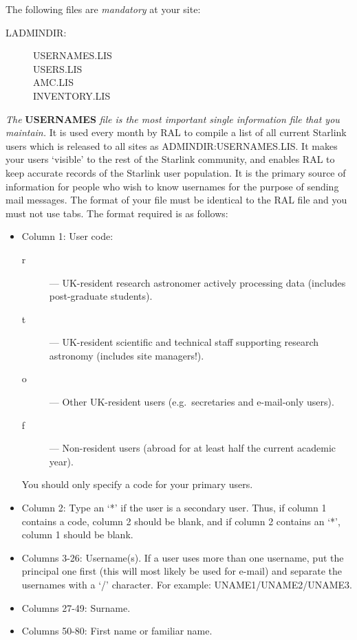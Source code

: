 The following files are {\em mandatory} at your site:
\begin{description}
\begin{description}
\item [LADMINDIR:] \hfill
\begin{description}
\item [USERNAMES.LIS] \hfill
\item [USERS.LIS] \hfill
\item [AMC.LIS] \hfill
\item [INVENTORY.LIS] \hfill
\end{description}
\end{description}
\end{description}
{\em The} {\bf USERNAMES} {\em file is the most important single information
file that you maintain.}
It is used every month by RAL to compile a list of all current Starlink users
which is released to all sites as ADMINDIR:USERNAMES.\-LIS.
It makes your users `visible' to the rest of the Starlink community, and enables
RAL to keep accurate records of the Starlink user population.
It is the primary source of information for people who wish to know usernames
for the purpose of sending mail messages.
The format of your file must be identical to the RAL file and you must not use
tabs.
The format required is as follows:
\begin{itemize}
\item Column 1: User code:
\begin{description}
\begin{description}
\item [r] --- UK-resident research astronomer actively processing data
 (includes post-graduate students).
\item [t] --- UK-resident scientific and technical staff supporting research
 astronomy (includes site managers!).
\item [o] --- Other UK-resident users (e.g.\ secretaries and e-mail-only users).
\item [f] --- Non-resident users (abroad for at least half the current academic
 year).
\end{description}
\end{description}
You should only specify a code for your primary users.
\item Column 2: Type an `*' if the user is a secondary user.
Thus, if column 1 contains a code, column 2 should be blank, and if column 2
contains an `*', column 1 should be blank.
\item Columns 3-26: Username(s).
If a user uses more than one username, put the principal one first (this will
most likely be used for e-mail) and separate the usernames with a `/' character.
For example: UNAME1/UNAME2/UNAME3.
\item Columns 27-49: Surname.
\item Columns 50-80: First name or familiar name.
\end{itemize}
